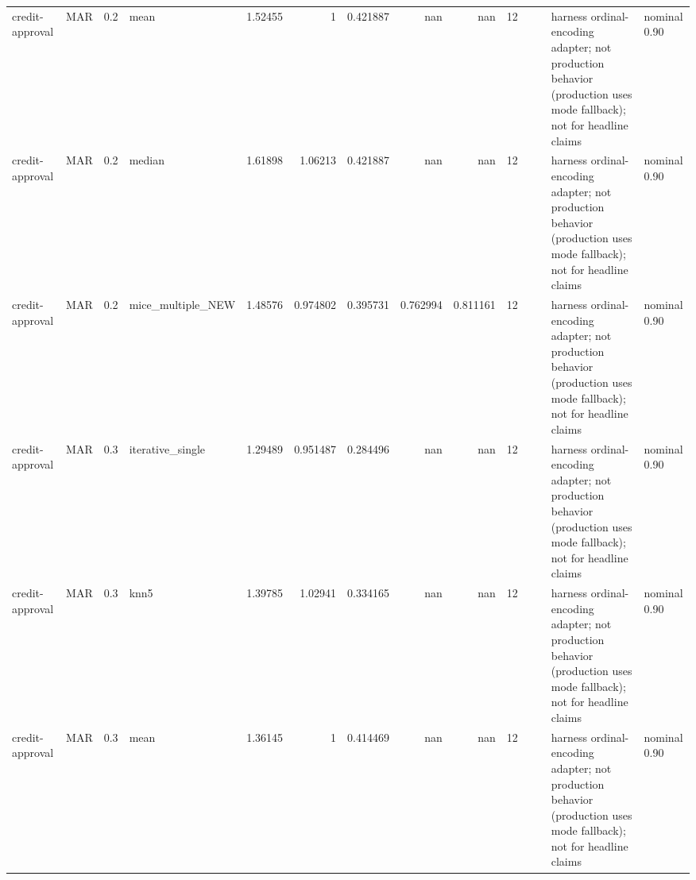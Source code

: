 \begin{table}[ht]
\begin{tabular}{llrlrrrrrrllll}
 credit-approval      & MAR         &         0.2 & mean              &       1.52455  &             1        &                 0.421887 &                     nan        &                       nan        &        12 &                    &                                         & harness ordinal-encoding adapter; not production behavior (production uses mode fallback); not for headline claims & nominal 0.90              \\
 credit-approval      & MAR         &         0.2 & median            &       1.61898  &             1.06213  &                 0.421887 &                     nan        &                       nan        &        12 &                    &                                         & harness ordinal-encoding adapter; not production behavior (production uses mode fallback); not for headline claims & nominal 0.90              \\
 credit-approval      & MAR         &         0.2 & mice\_multiple\_NEW &       1.48576  &             0.974802 &                 0.395731 &                       0.762994 &                         0.811161 &        12 &                    &                                         & harness ordinal-encoding adapter; not production behavior (production uses mode fallback); not for headline claims & nominal 0.90              \\
 credit-approval      & MAR         &         0.3 & iterative\_single  &       1.29489  &             0.951487 &                 0.284496 &                     nan        &                       nan        &        12 &                    &                                         & harness ordinal-encoding adapter; not production behavior (production uses mode fallback); not for headline claims & nominal 0.90              \\
 credit-approval      & MAR         &         0.3 & knn5              &       1.39785  &             1.02941  &                 0.334165 &                     nan        &                       nan        &        12 &                    &                                         & harness ordinal-encoding adapter; not production behavior (production uses mode fallback); not for headline claims & nominal 0.90              \\
 credit-approval      & MAR         &         0.3 & mean              &       1.36145  &             1        &                 0.414469 &                     nan        &                       nan        &        12 &                    &                                         & harness ordinal-encoding adapter; not production behavior (production uses mode fallback); not for headline claims & nominal 0.90              \\

\end{tabular}
\end{table}
